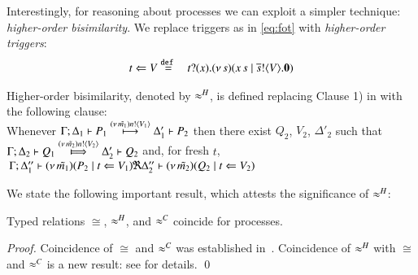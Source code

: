 {Interestingly, for reasoning about \HO processes we can exploit a simpler technique: \emph{higher-order bisimilarity}.
We replace triggers as in \eqref{eq:fot}
with \emph{higher-order triggers}:
\begin{eqnarray}
	t \Leftarrow V  & \stackrel{\mathtt{def}\ }{=} &  t ? (x) . (\nu\, s)(x\, {s} \;|\; \overline{s} ! \langle V \rangle . \mathbf{0}) \label{eq:hot} 
\end{eqnarray}
\begin{definition}%
	\label{d:hbw}
	Higher-order bisimilarity, denoted by $\approx^H$, is defined  replacing 
	Clause 1) in  with the following clause:\\[1mm]
	Whenever 
	$\Gamma; \Delta_1 \vdash P_1 \stackrel{(\nu\, \tilde{m_1}) n ! \langle V_1 \rangle}{\longmapsto} \Delta_1' \vdash P_2$ %
	then there exist 
	$Q_2$, $V_2$, $\Delta'_2$
	such that \\
	$\horel{\Gamma}{\Delta_2}{Q_1}{\Hby{\news{\tilde{m_2}}\bactout{n}{V_2}}}{\Delta_2'}{Q_2}$ %
	and, for fresh $t$, \\[1mm]
	$
	\begin{array}{lrlll}
		\!\!\Gamma; \Delta''_1  \vdash  {(\nu\, \tilde{m_1})(P_2 \;|\;t \Leftarrow V_1)}
		\ \!\!\Re\!\!\ \Delta''_2
		\vdash {(\nu\, \tilde{m_2})(Q_2 \;|\;t \Leftarrow V_2)}
	\end{array}
	$
\end{definition}

We state the following important result, which attests the significance of $\approx^H$:
\begin{theorem}\label{t:coincide}
	Typed relations $\cong$, $\approx^H$, and $\approx^C$ coincide for \HOp processes.
\end{theorem}
\begin{proof}
Coincidence of $\cong$ and $\approx^C$ was established in~\cite{characteristic_bis}.
Coincidence of $\approx^H$ with $\cong$ and $\approx^C$ is a new result: see \cite{KouzapasPY15}
for details. \qed
\end{proof}

}
